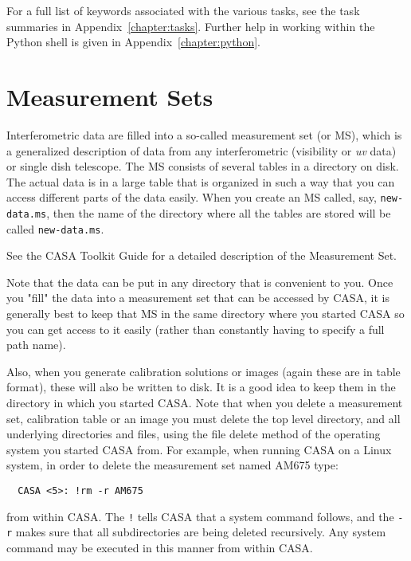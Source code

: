For a full list of keywords associated with the various tasks,
see the task summaries in Appendix~\ref{chapter:tasks}.  
Further help in working within
the Python shell is given in Appendix~\ref{chapter:python}.

\section{Measurement Sets}
\label{section:intro.ms}

Interferometric data are filled into a so-called measurement set (or
MS), which is a generalized description of data from any
interferometric (visibility or {\it uv} data) or single dish telescope.
The MS consists of several tables in a directory on disk.  The actual
data is in a large table that is organized in such a way that you can
access different parts of the data easily.  When you create an MS
called, say, {\tt new-data.ms}, then the name of the directory where all
the tables are stored will be called {\tt new-data.ms}.

See the CASA Toolkit Guide for a detailed description of the 
Measurement Set.

Note that the data can be put in any directory that is convenient to
you.  Once you "fill" the data into a measurement set that can be
accessed by CASA, it is generally best to keep that MS in the same
directory where you started CASA so you can get access to it easily
(rather than constantly having to specify a full path name).

Also, when you generate calibration solutions or images (again these
are in table format), these will also be written to disk.  It is a
good idea to keep them in the directory in which you started CASA.
Note that when you delete a measurement set, calibration table or an
image you must delete the top level directory, and all underlying
directories and files, using the file delete method of the operating
system you started CASA from.  For example, when running CASA on a
Linux system, in order to delete the measurement set named AM675 type:

\small
\begin{verbatim}
  CASA <5>: !rm -r AM675
\end{verbatim}
\normalsize

from within CASA.  The {\tt !} tells CASA that a system command follows,
and the {\tt -r} makes sure that all subdirectories are being deleted
recursively.  Any system command may be executed in this manner from
within CASA.


